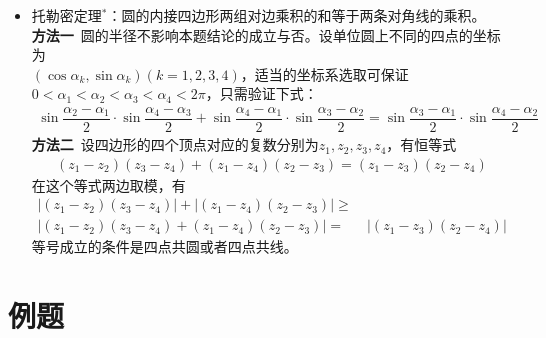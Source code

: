 \begin{itemize}[leftmargin=\inteval{\myitemleftmargin}pt,itemsep=
   \inteval{\myitemitempsep}pt,topsep=\inteval{\myitemtopsep}pt]
\item 托勒密定理$ ^* $：圆的内接四边形两组对边乘积的和等于两条对角线的乘积。\\
\textbf{方法一}\ 圆的半径不影响本题结论的成立与否。设单位圆上不同的四点的坐标为 \\
$ (\cos \alpha_k,\sin \alpha_k)(k=1,2,3,4) $，适当的坐标系选取可保证
$ 0< \alpha_1 <\alpha_2<\alpha_3<\alpha_4<2\pi $，只需验证下式：
\begin{align*}
    \sin\dfrac{\alpha_2-\alpha_1}{2}\cdot 
    \sin\dfrac{\alpha_4-\alpha_3}{2}+\sin\dfrac{\alpha_4-\alpha_1}{2}\cdot
    \sin\dfrac{\alpha_3-\alpha_2}{2}=\sin\dfrac{\alpha_3-\alpha_1}{2}\cdot 
    \sin\dfrac{\alpha_4-\alpha_2}{2}
\end{align*}
\textbf{方法二}\ 设四边形的四个顶点对应的复数分别为$ z_1,z_2,z_3,z_4 $，有恒等式
\begin{align*}
    (z_1-z_2)(z_3-z_4)+(z_1-z_4)(z_2-z_3)=(z_1-z_3)(z_2-z_4)
\end{align*}
在这个等式两边取模，有
\begin{align*}
    |(z_1-z_2)(z_3-z_4)|+|(z_1-z_4)(z_2-z_3)|\geq &\  \\
    |(z_1-z_2)(z_3-z_4)+(z_1-z_4)(z_2-z_3)|=&\ |(z_1-z_3)(z_2-z_4)|
\end{align*}
等号成立的条件是四点共圆或者四点共线。

\end{itemize}

\section{例题}

